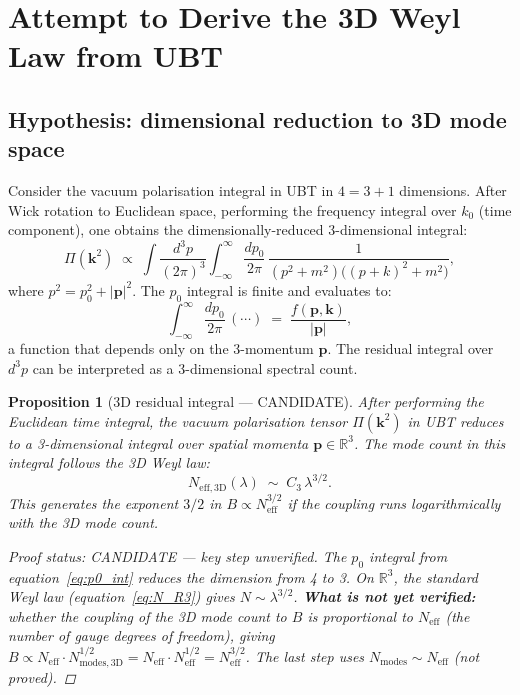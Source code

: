 \documentclass[11pt,a4paper]{article}
\newtheorem{proposition}{Proposition}
\theoremstyle{definition}
\theoremstyle{remark}
\begin{document}
\section{Attempt to Derive the 3D Weyl Law from UBT}
\label{sec:derive_3d}

\subsection{Hypothesis: dimensional reduction to 3D mode space}
\label{sec:dimred}

Consider the vacuum polarisation integral in UBT in $4 = 3 + 1$ dimensions.
After Wick rotation to Euclidean space, performing the frequency integral
over $k_0$ (time component), one obtains the dimensionally-reduced
3-dimensional integral:
\begin{equation}
  \Pi(\mathbf{k}^2)
  \;\propto\; \int \frac{d^3p}{(2\pi)^3}
    \int_{-\infty}^{\infty} \frac{dp_0}{2\pi}\,
    \frac{1}{(p^2 + m^2)\bigl((p+k)^2 + m^2\bigr)},
  \label{eq:Pi_4d}
\end{equation}
where $p^2 = p_0^2 + |\mathbf{p}|^2$.
The $p_0$ integral is finite and evaluates to:
\begin{equation}
  \int_{-\infty}^{\infty} \frac{dp_0}{2\pi}\,(\cdots)
  \;=\; \frac{f(\mathbf{p}, \mathbf{k})}{|\mathbf{p}|},
  \label{eq:p0_int}
\end{equation}
a function that depends only on the 3-momentum $\mathbf{p}$.
The residual integral over $d^3p$ can be interpreted as a 3-dimensional
spectral count.

\begin{proposition}[3D residual integral — CANDIDATE]
\label{prop:3d_residual}
  After performing the Euclidean time integral, the vacuum polarisation tensor
  $\Pi(\mathbf{k}^2)$ in UBT reduces to a 3-dimensional integral over spatial
  momenta $\mathbf{p} \in \mathbb{R}^3$.
  The mode count in this integral follows the 3D Weyl law:
  \begin{equation}
    N_{\mathrm{eff,3D}}(\lambda) \;\sim\; C_3\,\lambda^{3/2}.
    \label{eq:N_3D}
  \end{equation}
  This generates the exponent $3/2$ in $B \propto N_{\mathrm{eff}}^{3/2}$
  if the coupling runs logarithmically with the 3D mode count.

  \begin{proof}[Proof status: CANDIDATE — key step unverified]
    The $p_0$ integral from equation~\eqref{eq:p0_int} reduces the
    dimension from 4 to 3.
    On $\mathbb{R}^3$, the standard Weyl law (equation~\eqref{eq:N_R3})
    gives $N \sim \lambda^{3/2}$.
    \textbf{What is not yet verified:} whether the coupling of the
    3D mode count to $B$ is proportional to $N_{\mathrm{eff}}$ (the
    number of gauge degrees of freedom), giving
    $B \propto N_{\mathrm{eff}} \cdot N_{\mathrm{modes,3D}}^{1/2}
    = N_{\mathrm{eff}} \cdot N_{\mathrm{eff}}^{1/2} = N_{\mathrm{eff}}^{3/2}$.
    The last step uses $N_{\mathrm{modes}} \sim N_{\mathrm{eff}}$ (not proved).
  \end{proof}
\end{proposition}
\end{document}

